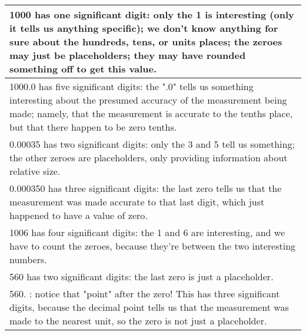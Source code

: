 \begin{itemize}
\begin{table}[h]
\begin{tabular}{|p{16cm}|}
\hline
\scriptsize{1000 has   one significant digit: only the 1 is interesting (only it tells us anything   specific); we don't know anything for sure about the hundreds, tens, or units   places; the zeroes may just be placeholders; they may have rounded something   off to get this value.                                    } \\ \hline
\scriptsize{1000.0 has five significant   digits: the ".0" tells us something interesting about the presumed   accuracy of the measurement being made; namely, that the measurement is   accurate to the tenths place, but that there happen to be zero tenths.                                                               } \\ \hline
\scriptsize{0.00035 has two significant   digits: only the 3 and 5 tell us something; the other zeroes are   placeholders, only providing information about relative size.                                                                                                                                                    } \\ \hline
\scriptsize{0.000350 has three significant   digits: the last zero tells us that the measurement was made accurate to that   last digit, which just happened to have a value of zero.                                                                                                                                         } \\ \hline
\scriptsize{1006 has four significant   digits: the 1 and 6 are interesting, and we have to count the zeroes, because   they're between the two interesting numbers.                                                                                                                                                          } \\ \hline
\scriptsize{560 has two significant   digits: the last zero is just a placeholder.                                                                                                                                                                                                                                            } \\ \hline
\scriptsize{560. : notice that   "point" after the zero! This has three significant digits, because   the decimal point tells us that the measurement was made to the nearest unit,   so the zero is not just a placeholder.                                                                                                  } \\ \hline

\end{tabular}
\end{table}
\end{itemize}
